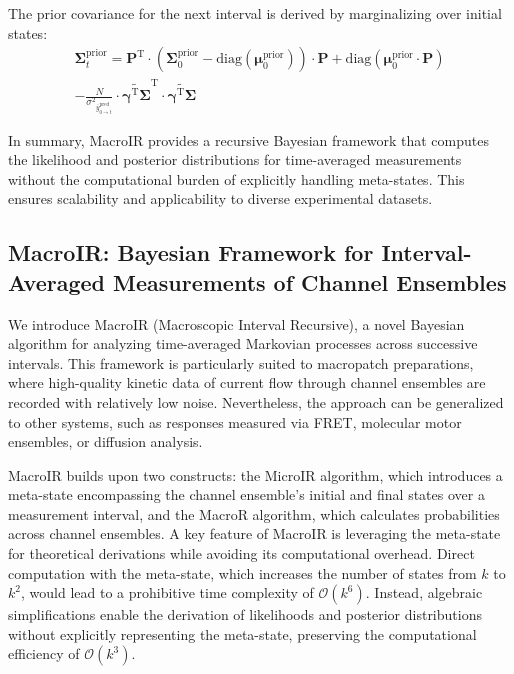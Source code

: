 \documentclass[pdflatex,sn-mathphys-num]{sn-jnl}%
\theoremstyle{thmstyleone}%
\theoremstyle{thmstyletwo}%
\theoremstyle{thmstylethree}%
\begin{document}
The prior covariance for the next interval is derived by marginalizing over initial states:
\begin{multline}
	\boldsymbol{\Sigma}^{\mathrm{prior}}_{t} = 
	\boldsymbol{P}^{\mathrm{T}} \cdot \left( \boldsymbol{\Sigma}^{\mathrm{prior}}_{0} - \mathrm{diag}(\boldsymbol{\mu}^{\mathrm{prior}}_{0}) \right) \cdot \boldsymbol{P}
	+ \mathrm{diag}(\boldsymbol{\mu}^{\mathrm{prior}}_{0} \cdot \boldsymbol{P}) \\
	- \frac{N}{{\sigma^2}_{\overline{y}^{\mathrm{pred}}_{0 \rightarrow t}}} \cdot
	\widetilde{\boldsymbol{\gamma}^{\mathrm{T}} \boldsymbol{\Sigma}}^{\mathrm{T}} \cdot \widetilde{\boldsymbol{\gamma}^{\mathrm{T}} \boldsymbol{\Sigma}}
	\label{eq:prior_covariance_update_0_t}
\end{multline}

In summary, MacroIR provides a recursive Bayesian framework that computes the likelihood and posterior distributions for time-averaged measurements without the computational burden of explicitly handling meta-states. This ensures scalability and applicability to diverse experimental datasets.







\subsection{MacroIR: Bayesian Framework for Interval-Averaged Measurements of Channel Ensembles}

We introduce MacroIR (Macroscopic Interval Recursive), a novel Bayesian algorithm for analyzing time-averaged Markovian processes across successive intervals. This framework is particularly suited to macropatch preparations, where high-quality kinetic data of current flow through channel ensembles are recorded with relatively low noise. Nevertheless, the approach can be generalized to other systems, such as responses measured via FRET, molecular motor ensembles, or diffusion analysis.

MacroIR builds upon two constructs: the MicroIR algorithm, which introduces a meta-state encompassing the channel ensemble's initial and final states over a measurement interval, and the MacroR algorithm, which calculates probabilities across channel ensembles. A key feature of MacroIR is leveraging the meta-state for theoretical derivations while avoiding its computational overhead. Direct computation with the meta-state, which increases the number of states from \( k \) to \( k^2 \), would lead to a prohibitive time complexity of \( \mathcal{O}(k^6) \). Instead, algebraic simplifications enable the derivation of likelihoods and posterior distributions without explicitly representing the meta-state, preserving the computational efficiency of \( \mathcal{O}(k^3) \).
\end{document}
